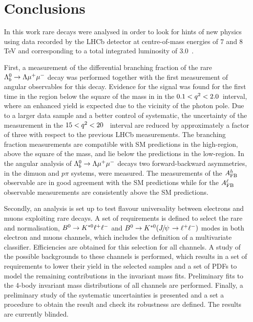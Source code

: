 \chapter{Conclusions}

In this work rare decays were analysed in order to look for hints of new physics using data recorded by the LHCb 
detector at centre-of-mass energies of 7 and 8 TeV and corresponding to a total integrated luminosity of 3.0~\invfb.

First, a measurement of the differential branching fraction of the rare $\Lambda^0_b\rightarrow\Lambda\mu^+\mu^-$ decay was performed together
with the first measurement of angular observables for this decay.
Evidence for the signal was found for the first time in the \qsq region below the square of the \jpsi mass in
in the $0.1 < q^2 < 2.0$~\gevgevcccc interval, where an enhanced yield is expected due to the vicinity of the photon pole. 
Due to a larger data sample and a better control of systematic, the uncertainty of the measurement in the $15 < q^2 < 20$~\gevgevcccc
interval are reduced by approximately a factor of three with respect to the previous LHCb measurements. 
The branching fraction measurements are compatible with SM predictions in the high-\qsq region, above the square
 of the \jpsi mass, and lie below the predictions in the low-\qsq region. In the angular analysis of $\Lambda^0_b\rightarrow\Lambda\mu^+\mu^-$ decays
 two forward-backward asymmetries, in the dimuon and $p\pi$ systems, were measured. The measurements
 of the $A_{\rm FB}^h$ observable are in good agreement with the SM predictions while for the $A_{\rm FB}^\ell$ observable
 measurements are consistently above the SM predictions.
 
Secondly, an analysis is set up to test flavour universality between electrons and muons exploiting rare decays.
A set of requirements is defined to select the rare and normalisation, $B^0\rightarrow K^{*0}\ell^+ \ell^-$ and $\Bz\to\Kstarz(\jpsi\to\ll)$ modes
in both electron and muons channels, which includes the definition of a multivariate classifier. 
Efficiencies are obtained for this selection for all channels.
A study of the possible backgrounds to these channels is performed, which results in
a set of requirements to lower their yield in the selected samples and a set of PDFs to model
the remaining contributions in the invariant mass fits. Preliminary fits to the 4-body invariant mass distributions
of all channels are performed. Finally, a preliminary study of the systematic uncertainties is presented and
a set a procedure to obtain the result and check its robustness are defined. The results are currently blinded.



